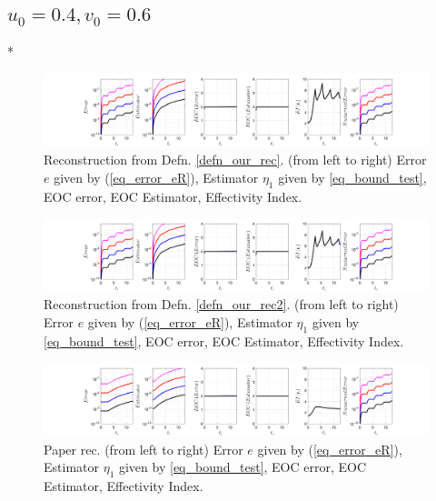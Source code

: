 \documentclass[12pt,a4paper]{article}
\numberwithin{equation}{section}
\theoremstyle{definition}
\begin{document}
\subsection*{$u_0=0.4, v_0= 0.6$}
\/*
\begin{figure}[H]
	\hspace{-3cm}
	\includegraphics[scale=0.55]{fig_LeapFrogplots_1x5_sin_IC_harmonic_order_2_u4_v6_rec_george}	
	\caption{Reconstruction from Defn. \ref{defn_our_rec}. (from left to right) Error $e$ given by (\ref{eq_error_eR}), Estimator $\eta_1$ given by \ref{eq_bound_test},  EOC error, EOC Estimator, Effectivity Index.}
	\label{fig_all_in_one_our_rec_george_u4_v6}
\end{figure}
\begin{figure}[H]
	\hspace{-3cm}
	\includegraphics[scale=0.55]{fig_LeapFrogplots_1x5_sin_IC_harmonic_order_2_u4_v6_rec2}	
	\caption{Reconstruction from Defn. \ref{defn_our_rec2}. (from left to right) Error $e$ given by (\ref{eq_error_eR}), Estimator $\eta_1$ given by \ref{eq_bound_test},  EOC error, EOC Estimator, Effectivity Index.}
	\label{fig_all_in_one_our_rec_2_u4_v6}
\end{figure}
\begin{figure}[H]
	\hspace{-3cm}
	\includegraphics[scale=0.55]{fig_LeapFrogplots_1x5_sin_IC_harmonic_u4_v6_paperrec}	
	\caption{Paper rec. (from left to right) Error $e$ given by (\ref{eq_error_eR}), Estimator $\eta_1$ given by \ref{eq_bound_test},  EOC error, EOC Estimator, Effectivity Index.}
	\label{fig_all_in_one_paperrec_u04_v06}
\end{figure}
\end{document}
